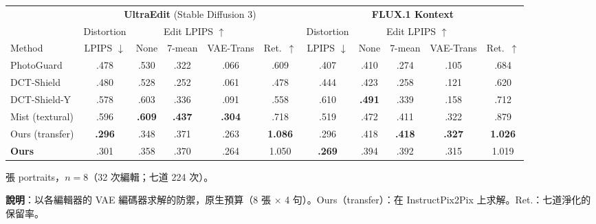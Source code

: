 \documentclass[10pt]{article}
\newcommand{\pend}[1]{#1}
\begin{document}
\begin{table}[h]
  \centering
  \footnotesize
  \setlength{\tabcolsep}{4pt}
  \begin{tabular}{l ccccc ccccc}
    \toprule
    & \multicolumn{5}{c}{\textbf{UltraEdit} (Stable Diffusion 3)} & \multicolumn{5}{c}{\textbf{FLUX.1 Kontext}} \\
    \cmidrule(lr){2-6} \cmidrule(l){7-11}
    & Distortion & \multicolumn{3}{c}{Edit LPIPS $\uparrow$} & & Distortion & \multicolumn{3}{c}{Edit LPIPS $\uparrow$} & \\
    \cmidrule(lr){3-5} \cmidrule(lr){8-10}
    Method & LPIPS $\downarrow$ & None & 7-mean & VAE-Trans & Ret.\ $\uparrow$ & LPIPS $\downarrow$ & None & 7-mean & VAE-Trans & Ret.\ $\uparrow$ \\
    \midrule
    PhotoGuard & \pend{.478} & \pend{.530} & \pend{.322} & \pend{.066} & \pend{.609} & \pend{.407} & \pend{.410} & \pend{.274} & \pend{.105} & \pend{.684} \\
    DCT-Shield & \pend{.480} & \pend{.528} & \pend{.252} & \pend{.061} & \pend{.478} & \pend{.444} & \pend{.423} & \pend{.258} & \pend{.121} & \pend{.620} \\
    DCT-Shield-Y & \pend{.578} & \pend{.603} & \pend{.336} & \pend{.091} & \pend{.558} & \pend{.610} & \pend{\textbf{.491}} & \pend{.339} & \pend{.158} & \pend{.712} \\
    Mist (textural) & \pend{.596} & \pend{\textbf{.609}} & \pend{\textbf{.437}} & \pend{\textbf{.304}} & \pend{.718} & \pend{.519} & \pend{.472} & \pend{.411} & \pend{.322} & \pend{.879} \\
    \midrule
    Ours (transfer) & \pend{\textbf{.296}} & \pend{.348} & \pend{.371} & \pend{.263} & \pend{\textbf{1.086}} & \pend{.296} & \pend{.418} & \pend{\textbf{.418}} & \pend{\textbf{.327}} & \pend{\textbf{1.026}} \\
    \rowcolor{oursrow}
    \textbf{Ours} & \pend{.301} & \pend{.358} & \pend{.370} & \pend{.264} & \pend{1.050} & \pend{\textbf{.269}} & \pend{.394} & \pend{.392} & \pend{.315} & \pend{1.019} \\
    \bottomrule
  \end{tabular}

   張 portraits，$n=8$（32 次編輯；七道 224 次）。
\end{table}

\textbf{說明}：以各編輯器的 VAE 編碼器求解的防禦，原生預算（8 張 $\times$ 4 句）。Ours（transfer）：在 InstructPix2Pix 上求解。Ret.：七道淨化的保留率。
\end{document}
